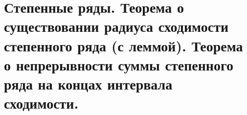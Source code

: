 {
	\section{Степенные ряды. Теорема о существовании радиуса сходимости степенного ряда (с леммой).
	Теорема о непрерывности суммы степенного ряда на концах интервала сходимости.}

	\newpage
}